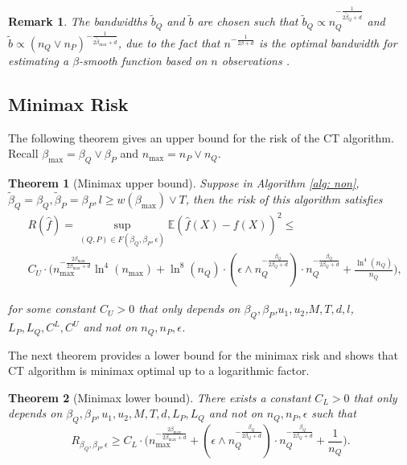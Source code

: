 \documentclass{article}
\def\E{\mathbb{E}}
\def\bmax{\beta_{\max}}
\newtheorem{theorem}{Theorem}
\newtheorem{remark}{Remark}
\begin{document}
\begin{remark}{\rm 
The bandwidths $\tilde b_Q$ and $\tilde b$ are chosen such that $\tilde b_Q\propto n_Q ^{-\frac{1}{2\tilde\beta_Q+d}}$ and $ \tilde b\propto(n_Q\vee n_P) ^{-\frac{1}{2\tilde \beta_{\max}+d}}$, due to the fact that $n^{-\frac{1}{2\beta+d}}$ is the optimal bandwidth for estimating a $\beta$-smooth function based on $n$ observations   \citep{gyorfi2002distribution}. 
}\end{remark}







\subsection{Minimax Risk}
\label{section: small minimax rate}

The following theorem gives an upper bound for the risk of the CT algorithm. Recall $\beta_{\max}=\beta_Q \vee \beta_P$ and $n_{\max}=n_P \vee n_Q$.
\begin{theorem}[Minimax upper bound]\label{th: non adaptive}
Suppose in Algorithm \ref{alg: non}, $\tilde \beta_Q=\beta_Q,\tilde \beta_P=\beta_P,l\geq w(\beta_{\max})\vee T$, then the risk of this algorithm satisfies
\begin{align*}
&R(\hat f)= \sup_{(Q,P)\in F(\beta_Q,\beta_P,\epsilon)}  \E (\hat f(X)-f(X))^2\leq \\
&C_U\cdot\bigg( n_{\max}^{-\frac{2\bmax}{2\bmax+d}}\ln^4(n_{\max})+ \ln^8(n_Q)\cdot(\epsilon \wedge n_Q^{-\frac{\beta_Q}{2\beta_Q+d}})\cdot n_Q^{-\frac{\beta_Q}{2\beta_Q+d}}+\frac{\ln^4(n_Q)}{n_Q}\bigg),    
\end{align*}

for some constant $C_U>0$ that only depends on $\beta_Q,\beta_P$,$u_1,u_2$,$M,T,d,l$,$L_P,L_Q,C^L,C^U$ and not on $n_Q,n_{P},\epsilon$.
\end{theorem}
The next theorem provides a lower bound for the minimax risk and shows that CT algorithm is minimax optimal up to a logarithmic factor.


\begin{theorem}[Minimax lower bound]\label{th: lower bound}  There exists a constant $C_L>0$ that only depends on $\beta_Q,\beta_P,u_1,u_2,M,T,d,L_P,L_Q$ and not on $n_Q,n_{P},\epsilon$ such that
 $$R_{\beta_Q,\beta_P,\epsilon} \geq C_L\cdot\bigg( n_{\max}^{-\frac{2\bmax}{2\bmax+d}}+ (\epsilon \wedge n_Q^{-\frac{\beta_Q}{2\beta_Q+d}})\cdot n_Q^{-\frac{\beta_Q}{2\beta_Q+d}}+\frac{1}{n_Q}\bigg).$$
\end{theorem}
\end{document}
